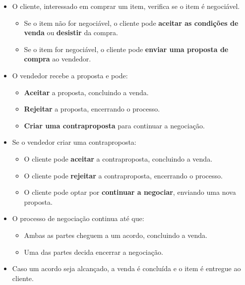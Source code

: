 \documentclass[a4paper, 12pt]{article} %
\begin{document}
\begin{itemize}
	\item O cliente, interessado em comprar um item, verifica se o item é negociável.
	\begin{itemize}

		\item Se o item não for negociável, o cliente pode \textbf{aceitar as condições de venda} ou \textbf{desistir} da compra.
		\item Se o item for negociável, o cliente pode \textbf{enviar uma proposta de compra} ao vendedor.
	\end{itemize}
	\item O vendedor recebe a proposta e pode:
	\begin{itemize}
		\item \textbf{ Aceitar} a proposta, concluindo a venda.
		\item \textbf{Rejeitar} a proposta, encerrando o processo.
		\item \textbf{Criar uma contraproposta} para continuar a negociação.
	\end{itemize}
	\item Se o vendedor criar uma contraproposta:
	\begin{itemize}
		\item O cliente pode \textbf{aceitar} a contraproposta, concluindo a venda.
		\item O cliente pode \textbf{rejeitar} a contraproposta, encerrando o processo.
		\item O cliente pode optar por \textbf{continuar a negociar}, enviando uma nova proposta.
	\end{itemize}
	\item O processo de negociação continua até que:
	\begin{itemize}
		\item Ambas as partes cheguem a um acordo, concluindo a venda.
		\item Uma das partes decida encerrar a negociação.
	\end{itemize}
	\item Caso um acordo seja alcançado, a venda é concluída e o item é entregue ao cliente.
\end{itemize}
\end{document}
